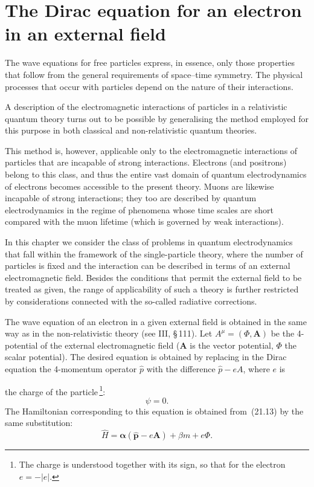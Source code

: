 \section{The Dirac equation for an electron in an external field}

The wave equations for free particles express, in essence, only those properties that follow from the general requirements of space--time symmetry. The physical processes that occur with particles depend on the nature of their interactions.

A description of the electromagnetic interactions of particles in a relativistic quantum theory turns out to be possible by generalising the method employed for this purpose in both classical and non-relativistic quantum theories.

This method is, however, applicable only to the electromagnetic interactions of particles that are incapable of strong interactions. Electrons (and positrons) belong to this class, and thus the entire vast domain of quantum electrodynamics of electrons becomes accessible to the present theory. Muons are likewise incapable of strong interactions; they too are described by quantum electrodynamics in the regime of phenomena whose time scales are short compared with the muon lifetime (which is governed by weak interactions).

In this chapter we consider the class of problems in quantum electrodynamics that fall within the framework of the single-particle theory, where the number of particles is fixed and the interaction can be described in terms of an external electromagnetic field. Besides the conditions that permit the external field to be treated as given, the range of applicability of such a theory is further restricted by considerations connected with the so-called radiative corrections.

The wave equation of an electron in a given external field is obtained in the same way as in the non-relativistic theory (see III, \S\,111). Let $A^\mu = (\Phi, \mathbf{A})$ be the 4-potential of the external electromagnetic field ($\mathbf{A}$ is the vector potential, $\Phi$ the scalar potential). The desired equation is obtained by replacing in the Dirac equation the 4-momentum operator $\widehat p$ with the difference $\widehat p - eA$, where $e$ is

the charge of the particle\,\footnote{The charge is understood together with its sign, so that for the electron $e = -|e|$.}:
\begin{equation}
[\gamma(\widehat p - eA) - m]\psi = 0.
\tag{32.1}
\end{equation}
The Hamiltonian corresponding to this equation is obtained from~(21.13) by the same substitution:
\begin{equation}
\widehat H = \boldsymbol{\alpha}(\widehat{\mathbf{p}} - e\mathbf{A}) + \beta m + e\Phi.
\tag{32.2}
\end{equation}

